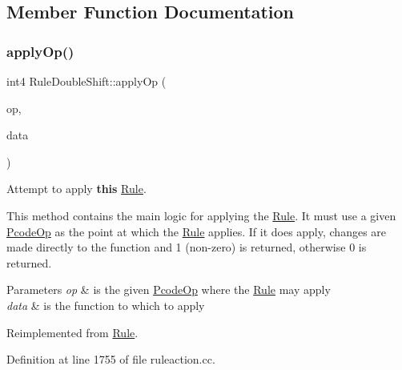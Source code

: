 \subsection{Member Function Documentation}
\mbox{\label{class_rule_double_shift_a02b2443037178261d417afd9689de91b}} 
\subsubsection{\texorpdfstring{applyOp()}{applyOp()}}
{\footnotesize\ttfamily int4 Rule\+Double\+Shift\+::apply\+Op (\begin{DoxyParamCaption}\item[{\mbox{\hyperlink{class_pcode_op}{Pcode\+Op}} $\ast$}]{op,  }\item[{\mbox{\hyperlink{class_funcdata}{Funcdata}} \&}]{data }\end{DoxyParamCaption})\hspace{0.3cm}{\ttfamily [virtual]}}



Attempt to apply {\bfseries{this}} \mbox{\hyperlink{class_rule}{Rule}}. 

This method contains the main logic for applying the \mbox{\hyperlink{class_rule}{Rule}}. It must use a given \mbox{\hyperlink{class_pcode_op}{Pcode\+Op}} as the point at which the \mbox{\hyperlink{class_rule}{Rule}} applies. If it does apply, changes are made directly to the function and 1 (non-\/zero) is returned, otherwise 0 is returned. 
\begin{DoxyParams}{Parameters}
{\em op} & is the given \mbox{\hyperlink{class_pcode_op}{Pcode\+Op}} where the \mbox{\hyperlink{class_rule}{Rule}} may apply \\
\hline
{\em data} & is the function to which to apply \\
\hline
\end{DoxyParams}


Reimplemented from \mbox{\hyperlink{class_rule_a4e3e61f066670175009f60fb9dc60848}{Rule}}.



Definition at line 1755 of file ruleaction.\+cc.

